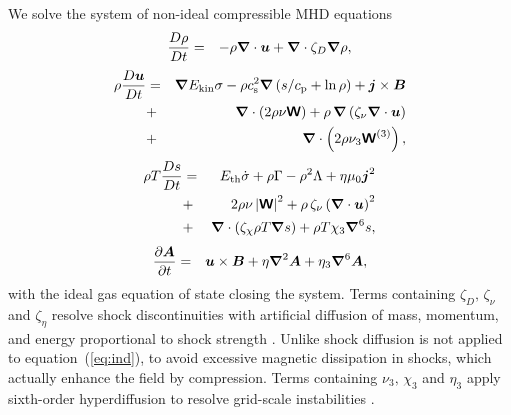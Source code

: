 \documentclass[preprint2]{aastex63}
\newcommand\ESK{E_{\rm kin}}
\newcommand\EST{E_{\rm th}}
\newcommand{\vect}[1]{{{\mbox{\boldmath $#1$}}}}%
\newcommand{\mathbfss}[1]{\textbf{\textsf{#1}}}
\begin{document}
We solve the system of non-ideal compressible MHD equations
  \begin{eqnarray}
  \label{eq:mass}
    \frac{D\rho}{Dt} &=& 
    -\rho \vect\nabla \cdot \vect{u}
    +\vect\nabla \cdot\zeta_D\vect\nabla\rho,
  \end{eqnarray}
  \begin{eqnarray}
  \label{eq:mom}
    \rho\frac{D\vect{u}}{Dt} &=& 
    \vect\nabla{\ESK\sigma}
    -\rho c_{\rm s}^2\vect\nabla\left({s}/{c_{\rm p}}+\ln\rho\right)
    +\vect{j}\times\vect{B}
    \nonumber\\
    &+&\vect\nabla\cdot \left(2\rho\nu{\mathbfss W}\right)
    +\rho\,\vect\nabla\left(\zeta_{\nu}\vect\nabla \cdot \vect{u} \right)
    \nonumber\\
    &+&\vect\nabla\cdot \left(2\rho\nu_3{\mathbfss W}^{(3)}\right),
  \end{eqnarray}
  \begin{eqnarray}
  \label{eq:ent}
    \rho T\frac{D s}{Dt} &=&
     \EST\dot\sigma +\rho\Gamma
    -\rho^2\Lambda +\eta\mu_0\vect{j}^2 
    \nonumber\\
    &+&2 \rho \nu\left|{\mathbfss W}\right|^{2}
    +\rho\,\zeta_{\nu}\left(\vect\nabla \cdot \vect{u} \right)^2
    \nonumber\\
    &+&\vect\nabla\cdot\left(\zeta_\chi\rho T\vect\nabla s\right)
    +\rho T\chi_3\vect\nabla^6 s,
  \end{eqnarray}
  \begin{eqnarray}
  \label{eq:ind}
    \frac{\partial \vect{A}}{\partial t} &=&
    \vect{u}\times\vect{B}
    +\eta\vect\nabla^2\vect{A}
    +\eta_3\vect\nabla^6\vect{A},
  \end{eqnarray}
 with the ideal gas equation of state closing the system.
 Terms containing $\zeta_D,\,\zeta_\nu$ and $\zeta_\eta$ 
      resolve shock discontinuities with artificial diffusion of mass,
      momentum, and energy proportional to shock strength  
 \citep[see][for details]{GMKSH20}.
 Unlike \citet{Gent:2013b} shock diffusion is not applied to
 equation~(\eqref{eq:ind}), to avoid excessive magnetic dissipation in
 shocks, which actually enhance the field by compression.
       Terms
 containing $\nu_3,\,\chi_3$ and $\eta_3$ apply sixth-order hyperdiffusion
 to resolve grid-scale instabilities
\citep[see, e.g.,][]{ABGS02,HB04}.
\end{document}
